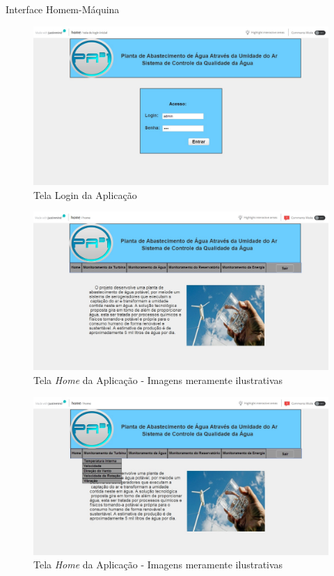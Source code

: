 \textual
\begin{center}
 {\large Interface Homem-Máquina}\\[0.2cm]
 

\begin{figure}[!ht]
\centering
\includegraphics[scale=0.45]{figuras/login}
\caption[Tela Login]{Tela Login da Aplicação}
\label{tela_login}
\end{figure}
\clearpage
 
\begin{figure}[!ht]
\centering
\includegraphics[scale=0.45]{figuras/home}
\caption[Home]{Tela \emph{Home} da Aplicação - Imagens meramente ilustrativas}
\label{tela_home}
\end{figure}
\clearpage

\begin{figure}[!ht]
\centering
\includegraphics[scale=0.45]{figuras/menu_monitoramento_da_turbina}
\caption[Home]{Tela \emph{Home} da Aplicação - Imagens meramente ilustrativas}
\label{tela_home}
\end{figure}
\clearpage


\end{center}
